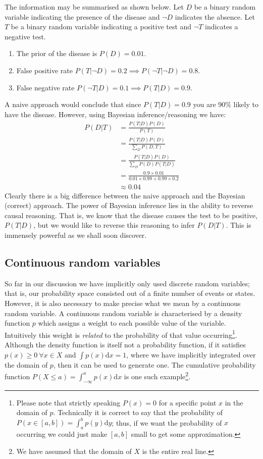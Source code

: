 The information may be summarised as shown below. Let $D$ be a binary random variable indicating the presence of the disease and $\neg D$ indicates the absence. Let $T$ be a binary random variable indicating a positive test and $\neg T$ indicates a negative test. 
\begin{enumerate}
\item
The prior of the disease is $P(D) = 0.01$.
\item
False positive rate $P(T|\neg D) = 0.2 \implies P(\neg T|\neg D) = 0.8$.
\item
False negative rate $P(\neg T|D) = 0.1 \implies P(T|D) = 0.9$.
\end{enumerate}
A naive approach would conclude that since $P(T|D) = 0.9$ you are 90\% likely to have the disease. However, using Bayesian inference/reasoning we have: 
\begin{equation*}
\begin{aligned}
P(D|T) &= \frac{P(T|D)P(D)}{P(T)} \\
&=  \frac{P(T|D)P(D)}{\sum_D P(D,T)} \\
&= \frac{P(T|D)P(D)}{\sum_D P(D)P(T|D)} \\
& = \frac{0.9 \times 0.01}{0.01 \times 0.99 + 0.99 \times 0.2} \\
&\approx 0.04
\end{aligned}
\end{equation*}
Clearly there is a big difference between the naive approach and the Bayesian (correct) approach. The power of Bayesian inference lies in the ability to reverse causal reasoning. That is, we know that the disease causes the test to be positive, $P(T|D)$, but we would like to reverse this reasoning to infer $P(D|T)$. This is immensely powerful as we shall soon discover.   

\subsection{Continuous random variables}

So far in our discussion we have implicitly only used discrete random variables; that is, our probability space consisted out of a finite number of events or states. However, it is also necessary to make precise what we mean by a continuous random variable. A continuous random variable is characterised by a density function $p$ which assigns a weight to each possible value of the variable. Intuitively this weight is \emph{related} to the probability of that value occurring\footnote{Please note that strictly speaking $P(x)=0$ for a specific point $x$ in the domain of $p$. Technically it is correct to say that the probability of $P(x \in [a,b]) = \int_a^b p(y) \text{d}y$; thus, if we want the probability of $x$ occurring we could just make $[a,b]$ small to get some approximation.}. Although the density function is itself not a probability function, if it satisfies $p(x) \geq 0~\forall x \in X$ and $\int p(x)\text{d}x = 1$, where we have implicitly integrated over the domain of $p$, then it can be used to generate one. The cumulative probability function $P(X \leq a)=\int^a_{-\infty} p(x)\text{d}x$ is one such example\footnote{We have assumed that the domain of $X$ is the entire real line.}. 

